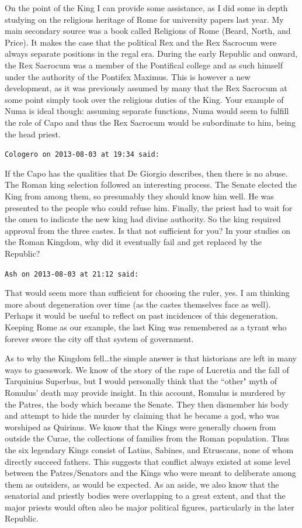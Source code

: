 \begin{footnotesize}
\begin{sffamily}
On the point of the King I can provide some assistance, as I did some in depth studying on the religious heritage of Rome for university papers last year. My main secondary source was a book called Religions of Rome (Beard, North, and Price). It makes the case that the political Rex and the Rex Sacrocum were always separate positions in the regal era. During the early Republic and onward, the Rex Sacrocum was a member of the Pontifical college and as such himself under the authority of the Pontifex Maximus. This is however a new development, as it was previously assumed by many that the Rex Sacrocum at some point simply took over the religious duties of the King. Your example of Numa is ideal though: assuming separate functions, Numa would seem to fulfill the role of Capo and thus the Rex Sacrocum would be subordinate to him, being the head priest.


\hfill

\texttt{Cologero on 2013-08-03 at 19:34 said: }

If the Capo has the qualities that De Giorgio describes, then there is no abuse. The Roman king selection followed an interesting process. The Senate elected the King from among them, so presumably they should know him well. He was presented to the people who could refuse him. Finally, the priest had to wait for the omen to indicate the new king had divine authority. So the king required approval from the three castes. Is that not sufficient for you? In your studies on the Roman Kingdom, why did it eventually fail and get replaced by the Republic?


\hfill

\texttt{Ash on 2013-08-03 at 21:12 said: }

That would seem more than sufficient for choosing the ruler, yes. I am thinking more about degeneration over time (as the castes themselves face as well). Perhaps it would be useful to reflect on past incidences of this degeneration. Keeping Rome as our example, the last King was remembered as a tyrant who forever swore the city off that system of government. 

As to why the Kingdom fell…the simple answer is that historians are left in many ways to guesswork. We know of the story of the rape of Lucretia and the fall of Tarquinius Superbus, but I would personally think that the ``other" myth of Romulus' death may provide insight. In this account, Romulus is murdered by the Patres, the body which became the Senate. They then dismember his body and attempt to hide the murder by claiming that he became a god, who was worshiped as Quirinus. We know that the Kings were generally chosen from outside the Curae, the collections of families from the Roman population. Thus the six legendary Kings consist of Latins, Sabines, and Etruscans, none of whom directly succeed fathers. This suggests that conflict always existed at some level between the Patres/Senators and the Kings who were meant to deliberate among them as outsiders, as would be expected. As an aside, we also know that the senatorial and priestly bodies were overlapping to a great extent, and that the major priests would often also be major political figures, particularly in the later Republic. 


\end{sffamily}
\end{footnotesize}
